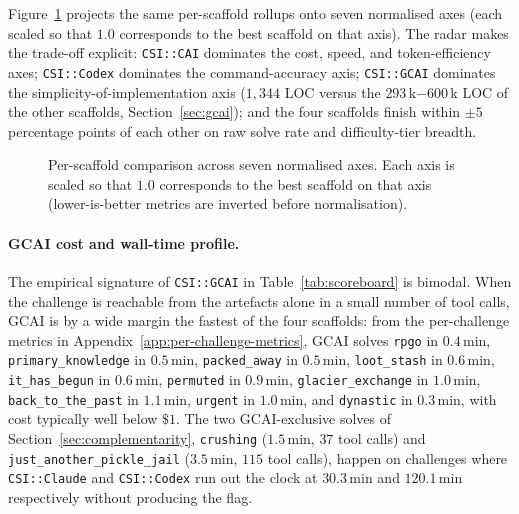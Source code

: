 Figure~\ref{fig:radar-overall} projects the same per-scaffold rollups onto seven normalised axes (each scaled so that $1.0$ corresponds to the best scaffold on that axis). The radar makes the trade-off explicit: \texttt{CSI::CAI} dominates the cost, speed, and token-efficiency axes; \texttt{CSI::Codex} dominates the command-accuracy axis; \texttt{CSI::GCAI} dominates the simplicity-of-implementation axis ($1{,}344$ LOC versus the $293$\,k$-600$\,k LOC of the other scaffolds, Section~\ref{sec:gcai}); and the four scaffolds finish within $\pm 5$ percentage points of each other on raw solve rate and difficulty-tier breadth.

\begin{figure}[t]
\centering
\resizebox{\columnwidth}{!}{}
\caption{Per-scaffold comparison across seven normalised axes. Each axis is scaled so that $1.0$ corresponds to the best scaffold on that axis (lower-is-better metrics are inverted before normalisation). %
}
\label{fig:radar-overall}
\end{figure}

\paragraph{GCAI cost and wall-time profile.}\label{sec:gcai-profile} The empirical signature of \texttt{CSI::GCAI} in Table~\ref{tab:scoreboard} is bimodal. When the challenge is reachable from the artefacts alone in a small number of tool calls, GCAI is by a wide margin the fastest of the four scaffolds: from the per-challenge metrics in Appendix~\ref{app:per-challenge-metrics}, GCAI solves \texttt{rpgo} in $0.4$\,min, \texttt{primary\_knowledge} in $0.5$\,min, \texttt{packed\_away} in $0.5$\,min, \texttt{loot\_stash} in $0.6$\,min, \texttt{it\_has\_begun} in $0.6$\,min, \texttt{permuted} in $0.9$\,min, \texttt{glacier\_exchange} in $1.0$\,min, \texttt{back\_to\_the\_past} in $1.1$\,min, \texttt{urgent} in $1.0$\,min, and \texttt{dynastic} in $0.3$\,min, with cost typically well below $\$1$. The two GCAI-exclusive solves of Section~\ref{sec:complementarity}, \texttt{crushing} ($1.5$\,min, $37$ tool calls) and \texttt{just\_another\_pickle\_jail} ($3.5$\,min, $115$ tool calls), happen on challenges where \texttt{CSI::Claude} and \texttt{CSI::Codex} run out the clock at $30.3$\,min and $120.1$\,min respectively without producing the flag.


